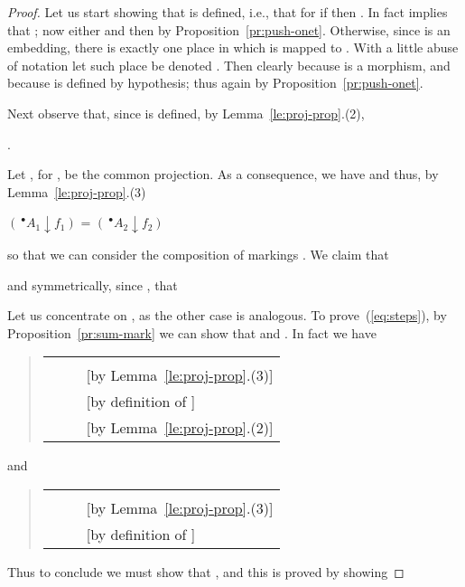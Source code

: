 \documentclass{LMCS}
\newcommand{\res}[2]{\ensuremath{({#1}\!\downarrow\!{#2})}}
\newcommand{\pre}[1][(\cdot)]{\ensuremath{\!~^\bullet{#1}}}
\begin{document}
\begin{proof}
  Let us start showing that  is
  defined, i.e., that for  if  then
  . In fact  implies that ; now either  and then
   by
  Proposition~\ref{pr:push-onet}. Otherwise, since  is an
  embedding, there is exactly one place in  which is mapped
  to . With a little abuse of notation let such place be denoted
  . Then clearly  because
   is a morphism, and  because
   is defined by hypothesis;
  thus again  by
  Proposition~\ref{pr:push-onet}.

  Next observe that, since  is
  defined, by Lemma~\ref{le:proj-prop}.(2),
  \begin{center}
    .
  \end{center}
  Let , for , be the
  common projection. As a consequence, we have  and thus, by Lemma~\ref{le:proj-prop}.(3)
  \begin{center}
    \res{\pre[A_1]}{f_1} = \res{\pre[A_2]}{f_2}
  \end{center}
  so that we can consider the composition of markings . We claim that
  
  and symmetrically, since , that 
  \begin{center}
    
  \end{center}

  Let us concentrate on , as the other case is analogous.
  To prove~(\ref{eq:steps}), by Proposition~\ref{pr:sum-mark} we can
  show that  and
  . In fact we have 
  \begin{quote}
    \begin{tabular}{lll}
       & \quad & 
      \\
\ \quad  & \quad & 
      [by Lemma~\ref{le:proj-prop}.(3)]\\ 
\ \quad  & \quad & 
      [by definition of ]\\ 
\ \quad  & & [by Lemma~\ref{le:proj-prop}.(2)]
    \end{tabular}
  \end{quote}
  and
  \begin{quote}
    \begin{tabular}{lll}
       & \quad & 
      \\
\ \quad  & \quad & 
      [by Lemma~\ref{le:proj-prop}.(3)]\\ 
\ \quad  & &
      [by definition of ]
    \end{tabular}
  \end{quote}
  Thus to conclude we must show that , and this is proved by showing
  

\end{proof}
\end{document}
